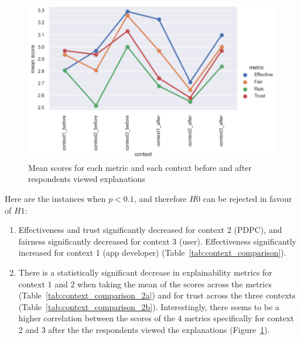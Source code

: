 \begin{figure}[!ht]
  \centering
  \includegraphics[width=1\linewidth]{figures/part2_part6_metric_comparison.png}
  \caption{Mean scores for each metric and each context before and after respondents viewed explanations}
  \label{fig:part2_part6_comparison}
\end{figure}


Here are the instances when $p<0.1$, and therefore $H0$ can be rejected in favour of $H1$:
\begin{enumerate}
    \item Effectiveness and trust significantly decreased for context 2 (PDPC), and fairness significantly decreased for context 3 (user). Effectiveness significantly increased for context 1 (app developer) (Table~\ref{tab:context_comparison}).
    \item There is a statistically significant decrease in explainability metrics for context 1 and 2 when taking the mean of the scores across the metrics (Table~\ref{tab:context_comparison_2a}) and for trust across the three contexts (Table~\ref{tab:context_comparison_2b}). Interestingly, there seems to be a higher correlation between the scores of the 4 metrics specifically for context 2 and 3 after the the respondents viewed the explanations (Figure~\ref{fig:part2_part6_comparison}).
\end{enumerate}

